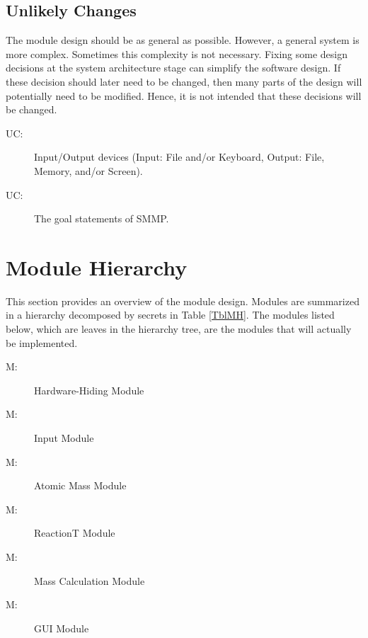 \documentclass[12pt, titlepage]{article}
\newcounter{ucnum}
\newcommand{\uctheucnum}{UC\theucnum}
\newcounter{mnum}
\newcommand{\mthemnum}{M\themnum}
\begin{document}
\subsection{Unlikely Changes} \label{SecUchange}

The module design should be as general as possible. However, a general system is
more complex. Sometimes this complexity is not necessary. Fixing some design
decisions at the system architecture stage can simplify the software design. If
these decision should later need to be changed, then many parts of the design
will potentially need to be modified. Hence, it is not intended that these
decisions will be changed.

\begin{description}
\item[ \uctheucnum \label{ucIO}:] Input/Output devices
  (Input: File and/or Keyboard, Output: File, Memory, and/or Screen).
\item[ \uctheucnum \label{ucIO}:] The goal statements of SMMP.

\end{description}

\section{Module Hierarchy} \label{SecMH}

This section provides an overview of the module design. Modules are summarized
in a hierarchy decomposed by secrets in Table \ref{TblMH}. The modules listed
below, which are leaves in the hierarchy tree, are the modules that will
actually be implemented.

\begin{description}
\item [ \mthemnum \label{mHH}:] Hardware-Hiding Module
\item [ \mthemnum \label{input}:] Input Module
\item [ \mthemnum \label{Atomic Mass}:] Atomic Mass Module
\item [ \mthemnum \label{Reaction}:] ReactionT Module 
\item [ \mthemnum \label{Mass}:] Mass Calculation Module
\item [ \mthemnum \label{display}:] GUI Module
\end{description}
\end{document}
